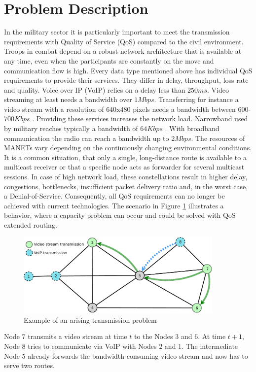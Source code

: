 \documentclass[runningheads]{llncs}
\newcommand{\MANET}{MANET}
\newcommand{\QOS}{QoS}
\newcommand{\VOIP}{VoIP}
\begin{document}
	\section{Problem Description}
	In the military sector it is particularly important to meet the transmission requirements with Quality of Service (\QOS{}) compared to the civil environment. Troops in combat depend on a robust network architecture that is available at any time, even when the participants are constantly on the move and communication flow is high. Every data type mentioned above has individual \QOS{} requirements to provide their services. They differ in delay, throughput, loss rate and quality. Voice over IP (\VOIP{}) relies on a delay less than $250ms$. Video streaming at least needs a bandwidth over $1Mbps$. Transferring for instance a video stream with a resolution of $640$x$480$ pixels needs a bandwidth between $600$-$700Kbps$ \cite{Video:Bandwidth}. Providing these services increases the network load. Narrowband used by military reaches typically a bandwidth of $64Kbps$ \cite{military:narrowband}. With broadband communication the radio can reach a bandwidth up to $2Mbps$. The resources of \MANET{s} vary depending on the continuously changing environmental conditions. It is a common situation, that only a single, long-distance route is available to a multicast receiver or that a specific node acts as forwarder for several multicast sessions. In case of high network load, these constellations result in higher delay, congestions, bottlenecks, insufficient packet delivery ratio and, in the worst case, a Denial-of-Service. Consequently, all \QOS{} requirements can no longer be achieved with current technologies. The scenario in Figure \ref{fig:multicast} illustrates a behavior, where a capacity problem can occur and could be solved with \QOS{} extended routing.
	\begin{figure}[h]
		\centering
		\includegraphics[width=0.9\textwidth]{figures/MulticastCommunicationOne.pdf}
		\caption{Example of an arising transmission problem}
		\label{fig:multicast}
	\end{figure}
	Node $7$ transmits a video stream at time $t$ to the Nodes $3$ and $6$. At time $t+1$, Node $8$ tries to communicate via \VOIP{} with Nodes $2$ and $1$. The intermediate Node $5$ already forwards the bandwidth-consuming video stream and now has to serve two routes. 
	
\end{document}
